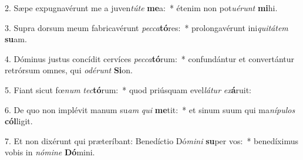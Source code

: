 2. Sæpe expugnavérunt me a juven\textit{tú}\textit{te} \textbf{me}a:~*  étenim non pot\textit{u}\textit{é}\textit{runt} \textbf{mi}hi.\

3. Supra dorsum meum fabricavérunt \textit{pec}\textit{ca}\textbf{tó}res:~*  prolongavérunt ini\textit{qui}\textit{tá}\textit{tem} \textbf{su}am.\

4. Dóminus justus concídit cervíces \textit{pec}\textit{ca}\textbf{tó}rum:~*  confundántur et convertántur retrórsum omnes, qui \textit{o}\textit{dé}\textit{runt} \textbf{Si}on.\

5. Fiant sicut fœ\textit{num} \textit{tec}\textbf{tó}rum:~*  quod priúsquam evel\textit{lá}\textit{tur} \textit{ex}\textbf{á}ruit:\

6. De quo non implévit manum su\textit{am} \textit{qui} \textbf{me}tit:~*  et sinum suum qui ma\textit{ní}\textit{pu}\textit{los} \textbf{cól}ligit.\

7. Et non dixérunt qui præteríbant: Benedíctio Dó\textit{mi}\textit{ni} \textbf{su}per vos:~*  benedíximus vobis in \textit{nó}\textit{mi}\textit{ne} \textbf{Dó}mini.\


